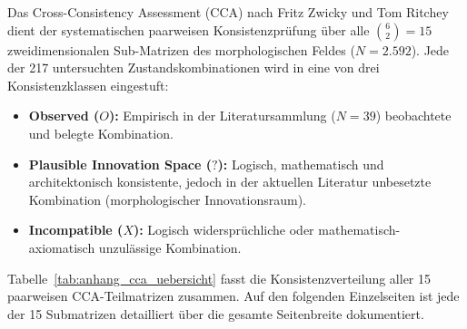 \begin{landscape}
Das Cross-Consistency Assessment (CCA) nach Fritz Zwicky und Tom Ritchey \parencite[S.~83 bis 91]{Z6N6V5L9} dient der systematischen paarweisen Konsistenzprüfung über alle $\binom{6}{2} = 15$ zweidimensionalen Sub-Matrizen des morphologischen Feldes ($N = 2.592$). Jede der 217 untersuchten Zustandskombinationen wird in eine von drei Konsistenzklassen eingestuft:
\begin{itemize}[leftmargin=*]
  \item \textbf{Observed ($O$):} Empirisch in der Literatursammlung ($N = 39$) beobachtete und belegte Kombination.
  \item \textbf{Plausible Innovation Space ($?$):} Logisch, mathematisch und architektonisch konsistente, jedoch in der aktuellen Literatur unbesetzte Kombination (morphologischer Innovationsraum).
  \item \textbf{Incompatible ($X$):} Logisch widersprüchliche oder mathematisch-axiomatisch unzulässige Kombination.
\end{itemize}

Tabelle~\ref{tab:anhang_cca_uebersicht} fasst die Konsistenzverteilung aller 15 paarweisen CCA-Teilmatrizen zusammen. Auf den folgenden Einzelseiten ist jede der 15 Submatrizen detailliert über die gesamte Seitenbreite dokumentiert.


\end{landscape}
